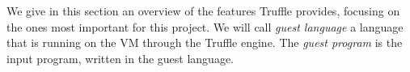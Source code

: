 \documentclass[twoside,11pt,a4paper]{article}
\begin{document}
We give in this section an overview of the features Truffle provides, focusing on the ones most important for this project. We will call \textit{guest language} a language that is running on the VM through the Truffle engine. The \textit{guest program} is the input program, written in the guest language.






\end{document}
